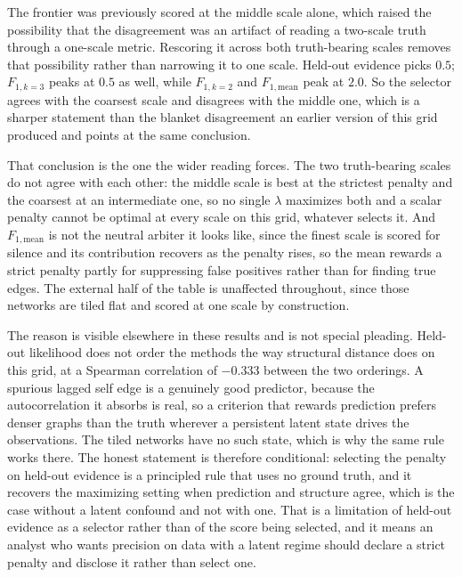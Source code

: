The frontier was previously scored at the middle scale alone, which raised the
possibility that the disagreement was an artifact of reading a two-scale truth
through a one-scale metric. Rescoring it across both truth-bearing scales
removes that possibility rather than narrowing it to one scale. Held-out
evidence picks $0.5$; $F_{1,k=3}$ peaks at $0.5$ as well, while $F_{1,k=2}$ and
$F_{1,\mathrm{mean}}$ peak at $2.0$. So the selector agrees with the coarsest
scale and disagrees with the middle one, which is a sharper statement than the
blanket disagreement an earlier version of this grid produced and points at the
same conclusion.

That conclusion is the one the wider reading forces. The two truth-bearing
scales do not agree with each other: the middle scale is best at the strictest
penalty and the coarsest at an intermediate one, so no single $\lambda$
maximizes both and a scalar penalty cannot be optimal at every scale on this
grid, whatever selects it. And $F_{1,\mathrm{mean}}$ is not the neutral arbiter
it looks like, since the finest scale is scored for silence and its contribution
recovers as the penalty rises, so the mean rewards a strict penalty partly for
suppressing false positives rather than for finding true edges. The external
half of the table is unaffected throughout, since those networks are tiled flat
and scored at one scale by construction.

The reason is visible elsewhere in these results and is not special pleading.
Held-out likelihood does not order the methods the way structural distance does
on this grid, at a Spearman correlation of $-0.333$ between the two orderings.
A spurious lagged self edge is a genuinely good predictor, because the
autocorrelation it absorbs is real, so a criterion that rewards prediction
prefers denser graphs than the truth wherever a persistent latent state drives
the observations. The tiled networks have no such state, which is why the same
rule works there. The honest statement is therefore conditional: selecting the
penalty on held-out evidence is a principled rule that uses no ground truth,
and it recovers the maximizing setting when prediction and structure agree,
which is the case without a latent confound and not with one. That is a
limitation of held-out evidence as a selector rather than of the score being
selected, and it means an analyst who wants precision on data with a latent
regime should declare a strict penalty and disclose it rather than select one.

